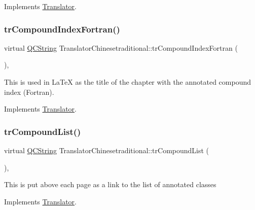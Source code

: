 Implements \mbox{\hyperlink{class_translator}{Translator}}.

\mbox{\label{class_translator_chinesetraditional_ab2091400b7f82668c9a865415554f078}} 
\subsubsection{\texorpdfstring{trCompoundIndexFortran()}{trCompoundIndexFortran()}}
{\footnotesize\ttfamily virtual \mbox{\hyperlink{class_q_c_string}{Q\+C\+String}} Translator\+Chinesetraditional\+::tr\+Compound\+Index\+Fortran (\begin{DoxyParamCaption}{ }\end{DoxyParamCaption})\hspace{0.3cm}{\ttfamily [inline]}, {\ttfamily [virtual]}}

This is used in La\+TeX as the title of the chapter with the annotated compound index (Fortran). 

Implements \mbox{\hyperlink{class_translator}{Translator}}.

\mbox{\label{class_translator_chinesetraditional_ab08d522825cf6d53f1f1c19bc8f4a3b5}} 
\subsubsection{\texorpdfstring{trCompoundList()}{trCompoundList()}}
{\footnotesize\ttfamily virtual \mbox{\hyperlink{class_q_c_string}{Q\+C\+String}} Translator\+Chinesetraditional\+::tr\+Compound\+List (\begin{DoxyParamCaption}{ }\end{DoxyParamCaption})\hspace{0.3cm}{\ttfamily [inline]}, {\ttfamily [virtual]}}

This is put above each page as a link to the list of annotated classes 

Implements \mbox{\hyperlink{class_translator}{Translator}}.

